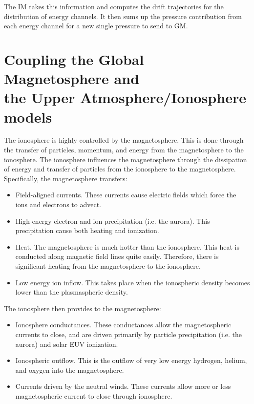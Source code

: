 \documentclass[twoside,10pt]{article}
\begin{document}
The IM takes this information and computes the drift trajectories for
the distribution of energy channels.  It then sums up the pressure
contribution from each energy channel for a new single pressure to send
to GM.

\section{Coupling the Global Magnetosphere and \\
         the Upper Atmosphere/Ionosphere models}

The ionosphere is highly controlled by the magnetosphere.  This is
done through the transfer of particles, momentum, and energy from the
magnetosphere to the ionosphere.  The ionosphere influences the
magnetosphere through the dissipation of energy and transfer of
particles from the ionosphere to the magnetosphere.  Specifically,
the magnetosphere transfers:

\begin{itemize}

\item
Field-aligned currents.  These currents cause electric fields which 
force the ions and electrons to advect.

\item
High-energy electron and ion precipitation (i.e. the aurora).  This
precipitation cause both heating and ionization.

\item
Heat.  The magnetosphere is much hotter than the ionosphere.  This
heat is conducted along magnetic field lines quite easily.  Therefore,
there is significant heating from the magnetosphere to the ionosphere.

\item
Low energy ion inflow.  This takes place when the ionospheric density
becomes lower than the plasmaspheric density.

\end{itemize}

The ionosphere then provides to the magnetosphere:

\begin{itemize}

\item
Ionosphere conductances.  These conductances allow the magnetospheric
currents to close, and are driven primarily by particle precipitation
(i.e. the aurora) and solar EUV ionization.

\item
Ionospheric outflow.  This is the outflow of very low energy hydrogen,
helium, and oxygen into the magnetosphere.

\item
Currents driven by the neutral winds.  These currents allow more or
less magnetospheric current to close through ionosphere.

\end{itemize}
\end{document}

